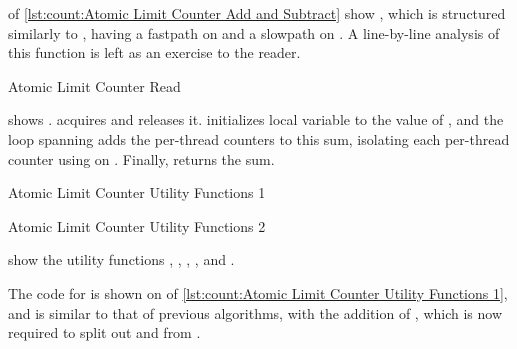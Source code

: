 \begin{fcvref}
 of
\cref{lst:count:Atomic Limit Counter Add and Subtract}
show , which is structured similarly to
, having a fastpath on
 and a slowpath on
.
A line-by-line analysis of this function is left as an exercise to
the reader.
\end{fcvref}

\begin{listing}

\caption{Atomic Limit Counter Read}
\label{lst:count:Atomic Limit Counter Read}
\end{listing}

\begin{fcvref}
 shows .
 acquires  and
 releases it.
 initializes local variable  to the value of
, and the loop spanning
 adds the
per-thread counters to this sum, isolating each per-thread counter
using  on .
Finally,  returns the sum.
\end{fcvref}

\begin{listing}

\caption{Atomic Limit Counter Utility Functions 1}
\label{lst:count:Atomic Limit Counter Utility Functions 1}
\end{listing}

\begin{listing}

\caption{Atomic Limit Counter Utility Functions 2}
\label{lst:count:Atomic Limit Counter Utility Functions 2}
\end{listing}

show the utility functions
,
,
,
, and
.
\begin{fcvref}
The code for  is shown on
of \cref{lst:count:Atomic Limit Counter Utility Functions 1}, and
is similar to that of previous algorithms, with the addition of
, which is now required to split out  and
 from .
\end{fcvref}

